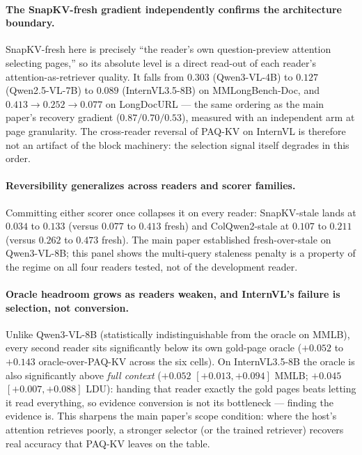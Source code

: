 \documentclass[letterpaper]{article} %
\newcommand{\paqc}{\textsc{PAQ-KV}}
\begin{document}
\paragraph{The SnapKV-fresh gradient independently confirms the architecture boundary.} SnapKV-fresh here is precisely ``the reader's own question-preview attention selecting pages,'' so its absolute level is a direct read-out of each reader's attention-as-retriever quality. It falls from $0.303$ (Qwen3-VL-4B) to $0.127$ (Qwen2.5-VL-7B) to $0.089$ (InternVL3.5-8B) on MMLongBench-Doc, and $0.413 \to 0.252 \to 0.077$ on LongDocURL --- the same ordering as the main paper's recovery gradient ($0.87/0.70/0.53$), measured with an independent arm at page granularity. The cross-reader reversal of \paqc{} on InternVL is therefore not an artifact of the block machinery: the selection signal itself degrades in this order.

\paragraph{Reversibility generalizes across readers and scorer families.} Committing either scorer once collapses it on every reader: SnapKV-stale lands at $0.034$ to $0.133$ (versus $0.077$ to $0.413$ fresh) and ColQwen2-stale at $0.107$ to $0.211$ (versus $0.262$ to $0.473$ fresh). The main paper established fresh-over-stale on Qwen3-VL-8B; this panel shows the multi-query staleness penalty is a property of the regime on all four readers tested, not of the development reader.

\paragraph{Oracle headroom grows as readers weaken, and InternVL's failure is selection, not conversion.} Unlike Qwen3-VL-8B (statistically indistinguishable from the oracle on MMLB), every second reader sits significantly below its own gold-page oracle ($+0.052$ to $+0.143$ oracle-over-\paqc{} across the six cells). On InternVL3.5-8B the oracle is also significantly above \emph{full context} ($+0.052$ $[+0.013,+0.094]$ MMLB; $+0.045$ $[+0.007,+0.088]$ LDU): handing that reader exactly the gold pages beats letting it read everything, so evidence conversion is not its bottleneck --- finding the evidence is. This sharpens the main paper's scope condition: where the host's attention retrieves poorly, a stronger selector (or the trained retriever) recovers real accuracy that \paqc{} leaves on the table.
\end{document}
